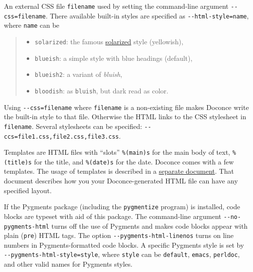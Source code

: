 \documentclass[a4paper]{article}
\begin{document}
An external CSS file \texttt{filename} used by setting the command-line
argument \texttt{-{}-css=filename}. There available built-in styles are
specified as \texttt{-{}-html-style=name}, where \texttt{name} can be
%
\begin{quote}
%
\begin{itemize}

\item \texttt{solarized}: the famous \href{http://ethanschoonover.com/solarized}{solarized}
style (yellowish),

\item \texttt{blueish}: a simple style with blue headings (default),

\item \texttt{blueish2}: a variant of \emph{bluish},

\item \texttt{bloodish}: as \texttt{bluish}, but dark read as color.

\end{itemize}

\end{quote}

Using \texttt{-{}-css=filename} where \texttt{filename} is a non-existing file makes
Doconce write the built-in style to that file. Otherwise the HTML
links to the CSS stylesheet in \texttt{filename}. Several stylesheets can
be specified: \texttt{-{}-ccs=file1.css,file2.css,file3.css}.

Templates are HTML files with ``slots'' \texttt{\%(main)s} for the main body
of text, \texttt{\%(title)s} for the title, and \texttt{\%(date)s} for the date.
Doconce comes with a few templates. The usage of templates is
described in a \href{https://doconce.googlecode.com/hg/doc/design/wrapper_tech.html}{separate document}. That document describes how you your Doconce-generated
HTML file can have any specified layout.

If the Pygments package (including the \texttt{pygmentize} program)
is installed, code blocks are typeset with
aid of this package. The command-line argument \texttt{-{}-no-pygments-html}
turns off the use of Pygments and makes code blocks appear with
plain (\texttt{pre}) HTML tags. The option \texttt{-{}-pygments-html-linenos} turns
on line numbers in Pygments-formatted code blocks. A specific
Pygments style is set by \texttt{-{}-pygments-html-style=style}, where \texttt{style}
can be \texttt{default}, \texttt{emacs}, \texttt{perldoc}, and other valid names for
Pygments styles.
\end{document}
